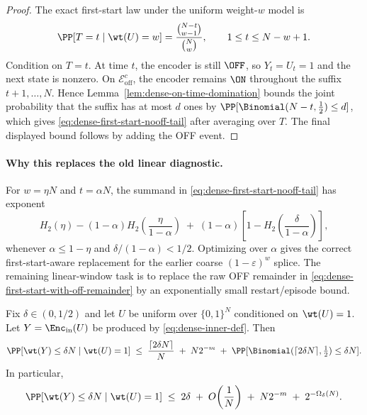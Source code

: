 \begin{proof}
The exact first-start law under the uniform weight-\(w\) model is
\[
\PP[T=t\mid \wt(U)=w]
=
\frac{\binom{N-t}{w-1}}{\binom{N}{w}},
\qquad 1\le t\le N-w+1.
\]
Condition on \(T=t\). At time \(t\), the encoder is still \(\OFF\), so \(Y_t=U_t=1\) and the next state is nonzero.
On \(\mathcal{E}_{\mathrm{off}}^c\), the encoder remains \(\ON\) throughout the suffix \(t+1,\dots,N\). Hence
Lemma~\ref{lem:dense-on-time-domination} bounds the joint probability that the suffix has at most \(d\) ones by
\(\PP[\Binomial(N-t,\tfrac12)\le d]\), which gives \eqref{eq:dense-first-start-nooff-tail} after averaging over \(T\).
The final displayed bound follows by adding the OFF event.
\end{proof}

\paragraph{Why this replaces the old linear diagnostic.}
For \(w=\eta N\) and \(t=\alpha N\), the summand in
\eqref{eq:dense-first-start-nooff-tail} has exponent
\[
H_2(\eta)
-
(1-\alpha)H_2\!\left(\frac{\eta}{1-\alpha}\right)
\;+\;
(1-\alpha)
\left[
1-H_2\!\left(\frac{\delta}{1-\alpha}\right)
\right],
\]
whenever \(\alpha\le 1-\eta\) and \(\delta/(1-\alpha)<1/2\). Optimizing over \(\alpha\) gives the correct
first-start-aware replacement for the earlier coarse \((1-\varepsilon)^w\) splice. The remaining linear-window task is
to replace the raw OFF remainder in \eqref{eq:dense-first-start-with-off-remainder} by an exponentially small
restart/episode bound.

\begin{corollary}
\label{cor:dense-inner-single-run}
Fix $\delta\in(0,1/2)$ and let $U$ be uniform over $\{0,1\}^N$ conditioned on $\wt(U)=1$.
Let $Y=\Enc_{\mathrm{in}}(U)$ be produced by \eqref{eq:dense-inner-def}. Then
\begin{equation}
\label{eq:dense-inner-single-run}
\PP[\wt(Y)\le \delta N \mid \wt(U)=1]
\;\le\;
\frac{\lceil 2\delta N\rceil}{N}
\;+\;
N2^{-m}
\;+\;
\PP[\Binomial(\lceil 2\delta N\rceil,\tfrac12)\le \delta N].
\end{equation}
In particular,
\begin{equation}
\label{eq:dense-inner-single-run-asym}
\PP[\wt(Y)\le \delta N \mid \wt(U)=1]
\;\le\;
2\delta
\;+\;
O\!\left(\frac{1}{N}\right)
\;+\;
N2^{-m}
\;+\;
2^{-\Omega_\delta(N)}.
\end{equation}
\end{corollary}

